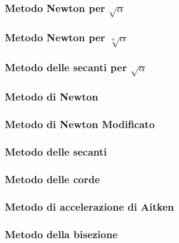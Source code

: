 \label{functcap2}
\subsubsection{Metodo Newton per $\sqrt{\alpha}$}

\subsubsection{Metodo Newton per $\sqrt[n]{\alpha}$}

\subsubsection{Metodo delle secanti per $\sqrt{\alpha}$}

\subsubsection{Metodo di Newton}

\subsubsection{Metodo di Newton Modificato}

\subsubsection{Metodo delle secanti}

\subsubsection{Metodo delle corde}

\subsubsection{Metodo di accelerazione di Aitken}

\subsubsection{Metodo della bisezione}
